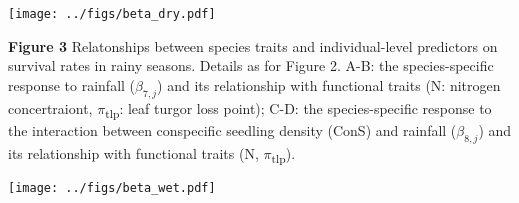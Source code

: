 \documentclass[
  12pt,
  letterpaper,
  DIV=11,
  numbers=noendperiod]{scrartcl}
\begin{document}
\texttt{[image: ../figs/beta\_dry.pdf]}

\newpage

\textbf{Figure 3} Relatonships between species traits and
individual-level predictors on survival rates in rainy seasons. Details
as for Figure 2. A-B: the species-specific response to rainfall
(\(\beta_{7,j}\)) and its relationship with functional traits (N:
nitrogen concertraiont, \(\pi\)\textsubscript{tlp}: leaf turgor loss
point); C-D: the species-specific response to the interaction between
conspecific seedling density (ConS) and rainfall (\(\beta_{8,j}\)) and
its relationship with functional traits (N, \(\pi\)\textsubscript{tlp}).

\texttt{[image: ../figs/beta\_wet.pdf]}
\end{document}
